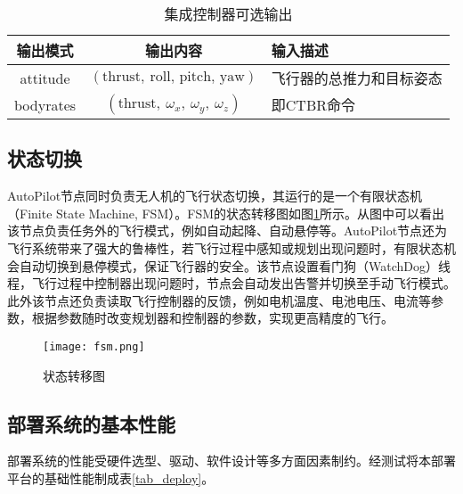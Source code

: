 \begin{table}
    \centering
    \begin{tabular}{ccl}
    \hline
        \textbf{输出模式} & \textbf{输出内容} & \textbf{输入描述} \\ \hline
        attitude & $(\text{thrust},\ \text{roll, pitch, yaw})$ & 飞行器的总推力和目标姿态 \\ 
        bodyrates & $(\text{thrust},\ \omega_x,\ \omega_y,\ \omega_z)$ & 即CTBR命令 \\ \hline
    \end{tabular}
    \caption{集成控制器可选输出}
    \label{tab_autopilot_output}
\end{table}

\subsection{状态切换}

AutoPilot节点同时负责无人机的飞行状态切换，其运行的是一个有限状态机（Finite State Machine, FSM）。FSM的状态转移图如图\ref{fig_fsm}所示。从图中可以看出该节点负责任务外的飞行模式，例如自动起降、自动悬停等。AutoPilot节点还为飞行系统带来了强大的鲁棒性，若飞行过程中感知或规划出现问题时，有限状态机会自动切换到悬停模式，保证飞行器的安全。该节点设置看门狗（WatchDog）线程，飞行过程中控制器出现问题时，节点会自动发出告警并切换至手动飞行模式。此外该节点还负责读取飞行控制器的反馈，例如电机温度、电池电压、电流等参数，根据参数随时改变规划器和控制器的参数，实现更高精度的飞行。

\begin{figure}
    \centering
    \texttt{[image: fsm.png]}
    \caption{状态转移图}
    \label{fig_fsm}
\end{figure}

\subsection{部署系统的基本性能}
部署系统的性能受硬件选型、驱动、软件设计等多方面因素制约。经测试将本部署平台的基础性能制成表\ref{tab_deploy}。

